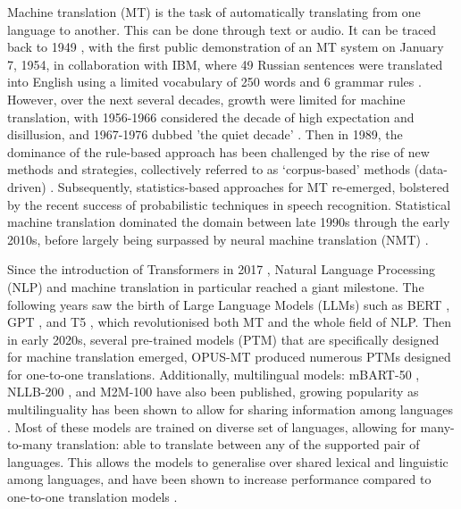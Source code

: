 \documentclass[a4paper]{article}
\begin{document}
Machine translation (MT) is the task of automatically translating from one language to another. This can be done through text or audio. It can be traced back to 1949 \cite{weaver-1999}, with the first public demonstration of an MT system on January 7, 1954, in collaboration with IBM, where 49 Russian sentences were translated into English using a limited vocabulary of 250 words and 6 grammar rules \cite{hutchins-2006-first-mt}. However, over the next several decades, growth were limited for machine translation, with 1956-1966 considered the decade of high expectation and disillusion, and 1967-1976 dubbed 'the quiet decade' \cite{hutchins-2001-mt-50-years}. Then in 1989, the dominance of the rule-based approach has been challenged by the rise of new methods and strategies, collectively referred to as ‘corpus-based’ methods (data-driven) \cite{hutchins-1994-research-methods-mt,hutchins-1998-development-mt}. Subsequently, statistics-based approaches for MT re-emerged, bolstered by the recent success of probabilistic techniques in speech recognition. Statistical machine translation \cite{lopez-2008-smt} dominated the domain between late 1990s through the early 2010s, before largely being surpassed by neural machine translation (NMT) \cite{cho-2014-properties,sutskever-2014-seq2seq}.

Since the introduction of Transformers in 2017 \cite{vaswani-2017-attention}, Natural Language Processing (NLP) and machine translation in particular reached a giant milestone. The following years saw the birth of Large Language Models (LLMs) such as BERT \cite{devlin-2019-bert}, GPT \cite{openai-2024-gpt4}, and T5 \cite{raffel-2023-t5}, which revolutionised both MT and the whole field of NLP. Then in early 2020s, several pre-trained models (PTM) that are specifically designed for machine translation emerged, OPUS-MT \cite{tiedemann-2020-opus-mt} produced numerous PTMs designed for one-to-one translations. Additionally, multilingual models: mBART-50 \cite{liu-2020-mbart}, NLLB-200 \cite{nllb200-2020}, and M2M-100 \cite{fan-2020-m2m100} have also been published, growing popularity as multilinguality has been shown to allow for sharing information among languages \cite{garcia-2020-multilingual}. Most of these models are trained on diverse set of languages, allowing for many-to-many translation: able to translate between any of the supported pair of languages. This allows the models to generalise over shared lexical and linguistic among languages, and have been shown to increase performance compared to one-to-one translation models \cite{liu-2020-mbart}.
\end{document}
